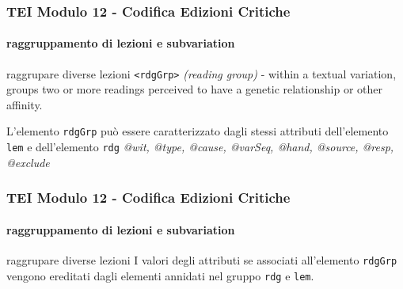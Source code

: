 \begin{frame}
    \frametitle{TEI Modulo 12 - Codifica Edizioni Critiche}
    \framesubtitle{raggruppamento di lezioni e subvariation}
    \addtocounter{nframe}{1}





   

    \begin{block}{raggrupare diverse lezioni}
        \texttt{<rdgGrp>} \textit{(reading group)} - within a textual variation, groups two or more readings perceived to have a genetic relationship or other affinity.
    \end{block}

    \begin{center}
       L'elemento \texttt{rdgGrp} può essere caratterizzato dagli stessi attributi dell'elemento \texttt{lem} e dell'elemento \texttt{rdg} \textit{@wit, @type, @cause, @varSeq, @hand, @source, @resp, @exclude}
    \end{center}

\end{frame}


\begin{frame}
    \frametitle{TEI Modulo 12 - Codifica Edizioni Critiche}
    \framesubtitle{raggruppamento di lezioni e subvariation}
    \addtocounter{nframe}{1}

   

    \begin{block}{raggrupare diverse lezioni}
        I valori degli attributi se associati all'elemento \texttt{rdgGrp} vengono ereditati dagli elementi annidati nel gruppo \texttt{rdg} e \texttt{lem}.
    \end{block}


\end{frame}

